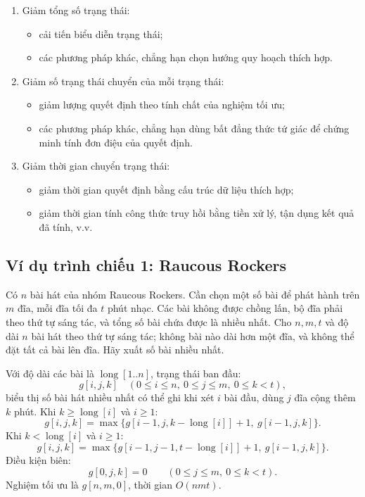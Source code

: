 \documentclass[11pt]{article}
\begin{document}
\begin{enumerate}
  \item Giảm tổng số trạng thái:
  \begin{itemize}
    \item cải tiến biểu diễn trạng thái;
    \item các phương pháp khác, chẳng hạn chọn hướng quy hoạch thích hợp.
  \end{itemize}
  \item Giảm số trạng thái chuyển của mỗi trạng thái:
  \begin{itemize}
    \item giảm lượng quyết định theo tính chất của nghiệm tối ưu;
    \item các phương pháp khác, chẳng hạn dùng bất đẳng thức tứ giác để chứng
    minh tính đơn điệu của quyết định.
  \end{itemize}
  \item Giảm thời gian chuyển trạng thái:
  \begin{itemize}
    \item giảm thời gian quyết định bằng cấu trúc dữ liệu thích hợp;
    \item giảm thời gian tính công thức truy hồi bằng tiền xử lý, tận dụng kết
    quả đã tính, v.v.
  \end{itemize}
\end{enumerate}

\subsection*{Ví dụ trình chiếu 1: Raucous Rockers}

Có \(n\) bài hát của nhóm Raucous Rockers. Cần chọn một số bài để phát hành
trên \(m\) đĩa, mỗi đĩa tối đa \(t\) phút nhạc. Các bài không được chồng lấn,
bộ đĩa phải theo thứ tự sáng tác, và tổng số bài chứa được là nhiều nhất. Cho
\(n,m,t\) và độ dài \(n\) bài hát theo thứ tự sáng tác; không bài nào dài hơn
một đĩa, và không thể đặt tất cả bài lên đĩa. Hãy xuất số bài nhiều nhất.

Với độ dài các bài là \(\operatorname{long}[1..n]\), trạng thái ban đầu:
\[
  g[i,j,k]\quad (0\le i\le n,\ 0\le j\le m,\ 0\le k<t),
\]
biểu thị số bài hát nhiều nhất có thể ghi khi xét \(i\) bài đầu, dùng \(j\)
đĩa cộng thêm \(k\) phút. Khi \(k\ge\operatorname{long}[i]\) và \(i\ge1\):
\[
  g[i,j,k]=\max\{g[i-1,j,k-\operatorname{long}[i]]+1,\ g[i-1,j,k]\}.
\]
Khi \(k<\operatorname{long}[i]\) và \(i\ge1\):
\[
  g[i,j,k]=
  \max\{g[i-1,j-1,t-\operatorname{long}[i]]+1,\ g[i-1,j,k]\}.
\]
Điều kiện biên:
\[
  g[0,j,k]=0\qquad (0\le j\le m,\ 0\le k<t).
\]
Nghiệm tối ưu là \(g[n,m,0]\), thời gian \(O(nmt)\).
\end{document}
